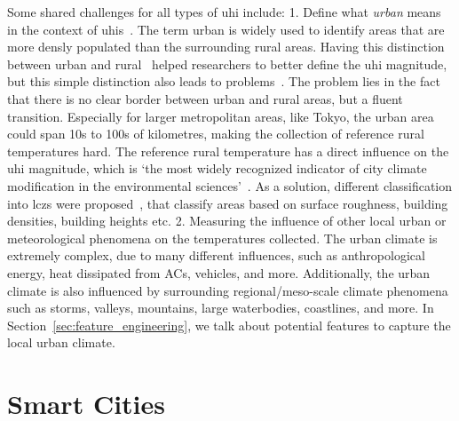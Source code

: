 Some shared challenges for all types of \gls{uhi} include: 1. Define what \textit{urban} means in the context of \gls{uhi}s~\cite{stewart2009newly}. The term urban is widely used to identify areas that are more densly populated than the surrounding rural areas. Having this distinction between urban and rural~\cite{lowry1977empirical} helped researchers to better define the \gls{uhi} magnitude, but this simple distinction also leads to problems~\cite{stewart2011systematic}. The problem lies in the fact that there is no clear border between urban and rural areas, but a fluent transition. Especially for larger metropolitan areas, like Tokyo, the urban area could span 10s to 100s of kilometres, making the collection of reference rural temperatures hard. The reference rural temperature has a direct influence on the \gls{uhi} magnitude, which is `the most widely recognized indicator of city climate modification in the environmental sciences'~\cite{stewart2009newly}. As a solution, different classification into \gls{lcz}s were proposed~\cite{stewart2012local, stewart2009newly}, that classify areas based on surface roughness, building densities, building heights etc. 2. Measuring the influence of other local urban or meteorological phenomena on the temperatures collected. The urban climate is extremely complex, due to many different influences, such as anthropological energy, heat dissipated from ACs, vehicles, and more. Additionally, the urban climate is also influenced by surrounding regional/meso-scale climate phenomena such as storms, valleys, mountains, large waterbodies, coastlines, and more. In Section~\ref{sec:feature_engineering}, we talk about potential features to capture the local urban climate.

\section{Smart Cities}

